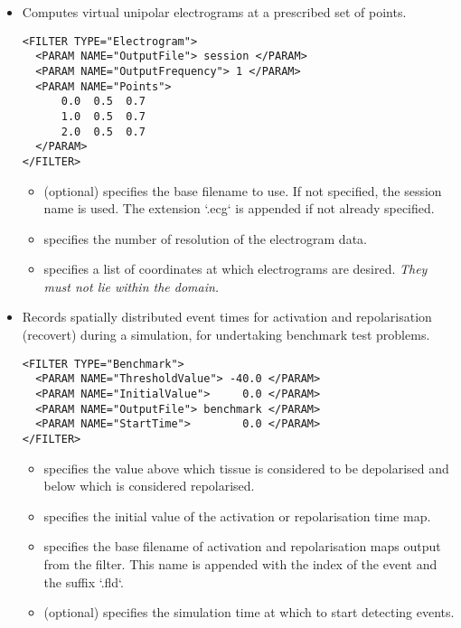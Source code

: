\begin{itemize}
    \item {} Computes virtual unipolar electrograms at a
     prescribed set of points.
\begin{lstlisting}[style=XmlStyle]
<FILTER TYPE="Electrogram">
  <PARAM NAME="OutputFile"> session </PARAM>
  <PARAM NAME="OutputFrequency"> 1 </PARAM>
  <PARAM NAME="Points">
      0.0  0.5  0.7
      1.0  0.5  0.7
      2.0  0.5  0.7
  </PARAM>
</FILTER>
\end{lstlisting}
    \begin{itemize}
    \item {} (optional) specifies the base filename to use. If
    not specified, the session name is used. The extension `.ecg` is appended if not already specified.
    \item {} specifies the number of resolution of the
    electrogram data.
    \item {} specifies a list of coordinates at which electrograms
    are desired. \emph{They must not lie within the domain.}
    \end{itemize}

\item {} Records spatially distributed event times for 
    activation and repolarisation (recovert) during a simulation, for
    undertaking benchmark test problems.
\begin{lstlisting}[style=XmlStyle]
<FILTER TYPE="Benchmark">
  <PARAM NAME="ThresholdValue"> -40.0 </PARAM>
  <PARAM NAME="InitialValue">     0.0 </PARAM>
  <PARAM NAME="OutputFile"> benchmark </PARAM>
  <PARAM NAME="StartTime">        0.0 </PARAM>
</FILTER>
\end{lstlisting}
    \begin{itemize}
        \item {} specifies the value above which tissue is
            considered to be depolarised and below which is considered
            repolarised.
        \item {} specifies the initial value of the
            activation or repolarisation time map.
        \item {} specifies the base filename of activation and
            repolarisation maps output from the filter. This name is appended
            with the index of the event and the suffix `.fld`.
        \item {} (optional) specifies the simulation time at
            which to start detecting events.
    \end{itemize}
\end{itemize}


